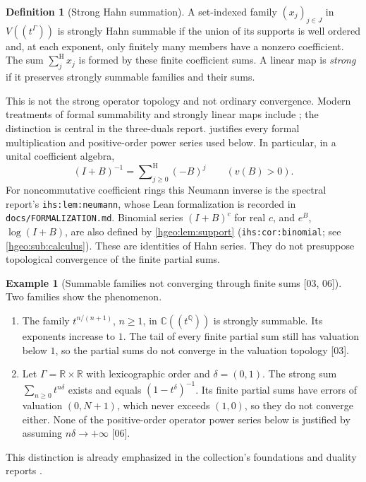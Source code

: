 \documentclass[11pt,letterpaper]{article}
\numberwithin{equation}{section}
\theoremstyle{definition}
\newtheorem{definition}[definition]{Definition}
\newtheorem{example}[example]{Example}
\theoremstyle{remark}
\newcommand{\R}{\mathbb R}
\newcommand{\C}{\mathbb C}
\newcommand{\Q}{\mathbb Q}
\newcommand{\sH}{\mathop{\sum}\nolimits^{\mathrm H}}
\newcommand{\src}[1]{\textup{\textsf{\small[#1]}}}
\newcommand{\replabel}[1]{\nolinkurl{#1}}
\newcommand{\fn}[1]{\nolinkurl{#1}}
\begin{document}
\begin{definition}[Strong Hahn summation]\label{hgeo:def:strong}
A set-indexed family $(x_j)_{j\in J}$ in $V((t^\Gamma))$ is strongly
Hahn summable if the union of its supports is well ordered and, at each
exponent, only finitely many members have a nonzero coefficient.
The sum $\sH_jx_j$ is formed by these finite coefficient sums. A linear map
is \emph{strong} if it preserves strongly summable families and their sums.
\end{definition}

This is not the strong operator topology and not ordinary convergence.
Modern treatments of formal summability and strongly linear maps include
\cite{Bagayoko,Freni}; the distinction is central in the three-duals report.
 justifies every formal multiplication and
positive-order power series used below. In particular, in a unital
coefficient algebra,
\begin{equation}\label{hgeo:eq:neumann}
 (I+B)^{-1}=\sH_{j\ge0}(-B)^j\qquad (v(B)>0).
\end{equation}
For noncommutative coefficient rings this Neumann inverse is the spectral
report's \replabel{ihs:lem:neumann}, whose Lean formalization is recorded in
\fn{docs/FORMALIZATION.md}. Binomial series $(I+B)^c$ for real $c$, and
$e^B$, $\log(I+B)$, are also defined by \cref{hgeo:lem:support}
(\replabel{ihs:cor:binomial}; see \cref{hgeo:sub:calculus}). These are
identities of Hahn series. They do not presuppose topological convergence of
the finite partial sums.

\begin{example}[Summable families not converging through finite sums
\src{03, 06}]\label{hgeo:ex:partialsums}
Two families show the phenomenon.
\begin{enumerate}[label=\textup{(\alph*)}]
\item The family $t^{n/(n+1)}$, $n\ge1$, in $\C((t^\Q))$ is strongly
summable. Its exponents increase to $1$. The tail of every finite partial
sum still has valuation below $1$, so the partial sums do not converge in
the valuation topology \src{03}.
\item Let $\Gamma=\R\times\R$ with lexicographic order and $\delta=(0,1)$.
The strong sum $\sum_{n\ge0}t^{n\delta}$ exists and equals
$(1-t^\delta)^{-1}$. Its finite partial sums have errors of valuation
$(0,N+1)$, which never exceeds $(1,0)$, so they do not converge either. None
of the positive-order operator power series below is justified by assuming
$n\delta\to+\infty$ \src{06}.
\end{enumerate}
This distinction is already emphasized in the collection's foundations and
duality reports \cite{RepoFound,RepoDuals}.
\end{example}
\end{document}
